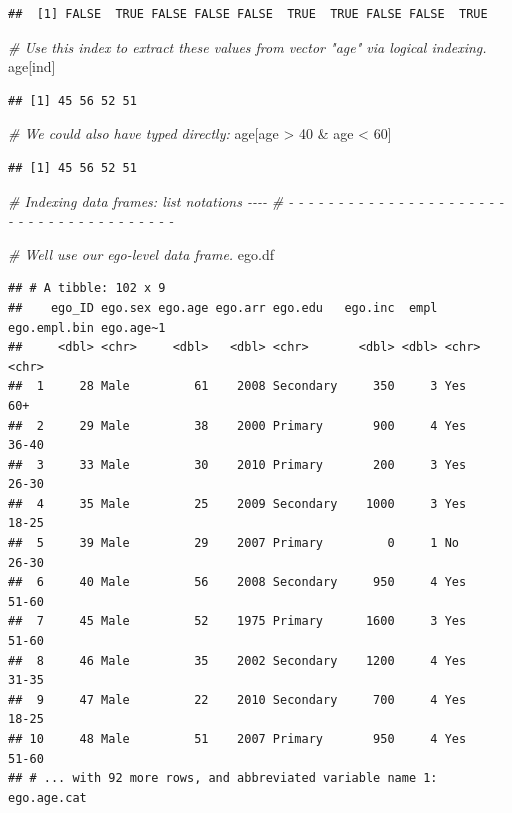 \documentclass[
]{book}
\newenvironment{Shaded}{\begin{snugshade}}{\end{snugshade}}
\newcommand{\CommentTok}[1]{\textcolor[rgb]{0.56,0.35,0.01}{\textit{#1}}}
\newcommand{\DecValTok}[1]{\textcolor[rgb]{0.00,0.00,0.81}{#1}}
\newcommand{\NormalTok}[1]{#1}
\newcommand{\SpecialCharTok}[1]{\textcolor[rgb]{0.00,0.00,0.00}{#1}}
\begin{document}
\begin{verbatim}
##  [1] FALSE  TRUE FALSE FALSE FALSE  TRUE  TRUE FALSE FALSE  TRUE
\end{verbatim}

\begin{Shaded}
\begin{Highlighting}[]
\CommentTok{\# Use this index to extract these values from vector "age" via logical indexing.}
\NormalTok{age[ind]}
\end{Highlighting}
\end{Shaded}

\begin{verbatim}
## [1] 45 56 52 51
\end{verbatim}

\begin{Shaded}
\begin{Highlighting}[]
\CommentTok{\# We could also have typed directly:}
\NormalTok{age[age }\SpecialCharTok{\textgreater{}} \DecValTok{40} \SpecialCharTok{\&}\NormalTok{ age }\SpecialCharTok{\textless{}} \DecValTok{60}\NormalTok{]}
\end{Highlighting}
\end{Shaded}

\begin{verbatim}
## [1] 45 56 52 51
\end{verbatim}

\begin{Shaded}
\begin{Highlighting}[]
\CommentTok{\# Indexing data frames: list notations                                      {-}{-}{-}{-} }
\CommentTok{\# {-} {-} {-} {-} {-} {-} {-} {-} {-} {-} {-} {-} {-} {-} {-} {-} {-} {-} {-} {-} {-} {-} {-} {-} {-} {-} {-} {-} {-} {-} {-} {-} {-} {-} {-} {-} {-} {-} {-} }

\CommentTok{\# We\textquotesingle{}ll use our ego{-}level data frame.}
\NormalTok{ego.df}
\end{Highlighting}
\end{Shaded}

\begin{verbatim}
## # A tibble: 102 x 9
##    ego_ID ego.sex ego.age ego.arr ego.edu   ego.inc  empl ego.empl.bin ego.age~1
##     <dbl> <chr>     <dbl>   <dbl> <chr>       <dbl> <dbl> <chr>        <chr>    
##  1     28 Male         61    2008 Secondary     350     3 Yes          60+      
##  2     29 Male         38    2000 Primary       900     4 Yes          36-40    
##  3     33 Male         30    2010 Primary       200     3 Yes          26-30    
##  4     35 Male         25    2009 Secondary    1000     3 Yes          18-25    
##  5     39 Male         29    2007 Primary         0     1 No           26-30    
##  6     40 Male         56    2008 Secondary     950     4 Yes          51-60    
##  7     45 Male         52    1975 Primary      1600     3 Yes          51-60    
##  8     46 Male         35    2002 Secondary    1200     4 Yes          31-35    
##  9     47 Male         22    2010 Secondary     700     4 Yes          18-25    
## 10     48 Male         51    2007 Primary       950     4 Yes          51-60    
## # ... with 92 more rows, and abbreviated variable name 1: ego.age.cat
\end{verbatim}
\end{document}
